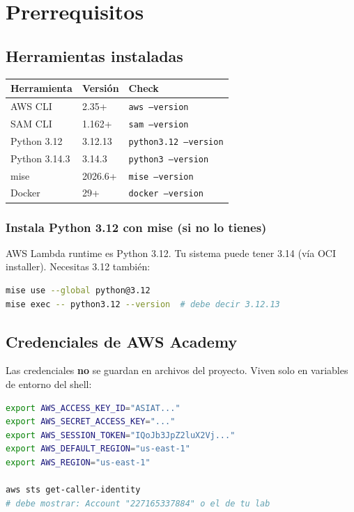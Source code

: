 \documentclass[11pt,a4paper,oneside]{article}
\newcommand{\cmd}[1]{\texttt{\small #1}}
\begin{document}
\section{Prerrequisitos}

\subsection{Herramientas instaladas}

\begin{center}
\begin{tabular}{@{}lll@{}}
\toprule
\textbf{Herramienta} & \textbf{Versi\'on} & \textbf{Check} \\
\midrule
AWS CLI & 2.35+ & \cmd{aws --version} \\
SAM CLI & 1.162+ & \cmd{sam --version} \\
Python 3.12 & 3.12.13 & \cmd{python3.12 --version} \\
Python 3.14.3 & 3.14.3 & \cmd{python3 --version} \\
mise & 2026.6+ & \cmd{mise --version} \\
Docker & 29+ & \cmd{docker --version} \\
\bottomrule
\end{tabular}
\end{center}

\subsubsection{Instala Python 3.12 con mise (si no lo tienes)}

AWS Lambda runtime es Python 3.12. Tu sistema puede tener 3.14 (v\'ia OCI installer). Necesitas 3.12 tambi\'en:

\begin{lstlisting}[language=bash]
mise use --global python@3.12
mise exec -- python3.12 --version  # debe decir 3.12.13
\end{lstlisting}

\subsection{Credenciales de AWS Academy}

Las credenciales \textbf{no} se guardan en archivos del proyecto. Viven solo en variables de entorno del shell:

\begin{lstlisting}[language=bash]
export AWS_ACCESS_KEY_ID="ASIAT..."
export AWS_SECRET_ACCESS_KEY="..."
export AWS_SESSION_TOKEN="IQoJb3JpZ2luX2Vj..."
export AWS_DEFAULT_REGION="us-east-1"
export AWS_REGION="us-east-1"

aws sts get-caller-identity
# debe mostrar: Account "227165337884" o el de tu lab
\end{lstlisting}
\end{document}
